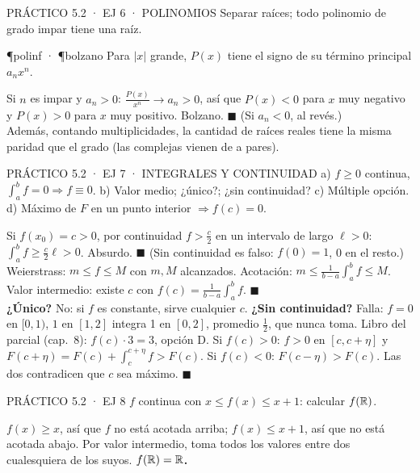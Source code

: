 \begin{enunciado}{PRÁCTICO 5.2 · EJ 6 · POLINOMIOS}
Separar raíces; todo polinomio de grado impar tiene una raíz.
\end{enunciado}
\begin{uso}{\P{polinf} · \P{bolzano}}
Para $|x|$ grande, $P(x)$ tiene el signo de su término principal $a_nx^n$.
\end{uso}
Si $n$ es impar y $a_n>0$: $\frac{P(x)}{x^n}\to a_n>0$, así que $P(x)<0$ para $x$ muy negativo y $P(x)>0$ para $x$ muy positivo. Bolzano. $\blacksquare$ (Si $a_n<0$, al revés.)\\
Además, contando multiplicidades, la cantidad de raíces reales tiene la misma paridad que el grado (las complejas vienen de a pares).

\begin{enunciado}{PRÁCTICO 5.2 · EJ 7 · INTEGRALES Y CONTINUIDAD}
a) $f\ge0$ continua, $\int_a^bf=0\Rightarrow f\equiv0$. b) Valor medio; ¿único?; ¿sin continuidad? c) Múltiple opción. d) Máximo de $F$ en un punto interior $\Rightarrow f(c)=0$.
\end{enunciado}
Si $f(x_0)=c>0$, por continuidad $f>\frac c2$ en un intervalo de largo $\ell>0$: $\int_a^bf\ge\frac c2\ell>0$. Absurdo. $\blacksquare$ (Sin continuidad es falso: $f(0)=1$, 0 en el resto.)
Weierstrass: $m\le f\le M$ con $m,M$ alcanzados. Acotación: $m\le\frac1{b-a}\int_a^bf\le M$. Valor intermedio: existe $c$ con $f(c)=\frac1{b-a}\int_a^bf$. $\blacksquare$\\
\textbf{¿Único?} No: si $f$ es constante, sirve cualquier $c$. \textbf{¿Sin continuidad?} Falla: $f=0$ en $[0,1)$, $1$ en $[1,2]$ integra 1 en $[0,2]$, promedio $\frac12$, que nunca toma.
Libro del parcial (cap.\ 8): $f(c)\cdot3=3$, opción D.
Si $f(c)>0$: $f>0$ en $[c,c+\eta]$ y $F(c+\eta)=F(c)+\int_c^{c+\eta}f>F(c)$. Si $f(c)<0$: $F(c-\eta)>F(c)$. Las dos contradicen que $c$ sea máximo. $\blacksquare$

\begin{enunciado}{PRÁCTICO 5.2 · EJ 8}
$f$ continua con $x\le f(x)\le x+1$: calcular $f(\mathbb{R})$.
\end{enunciado}
$f(x)\ge x$, así que $f$ no está acotada arriba; $f(x)\le x+1$, así que no está acotada abajo. Por valor intermedio, toma todos los valores entre dos cualesquiera de los suyos. \textbf{$f(\mathbb{R})=\mathbb{R}$.}

